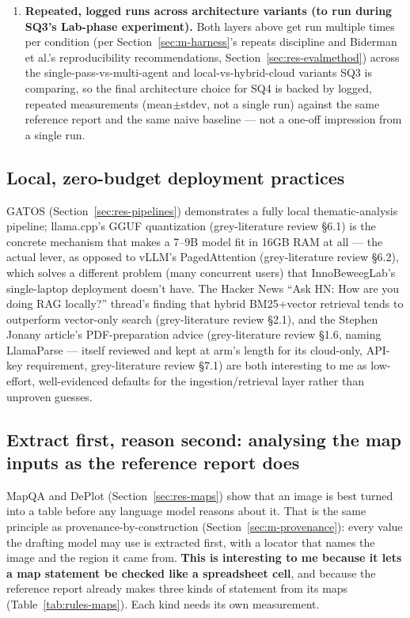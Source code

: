 \begin{enumerate}
\item \textbf{Repeated, logged runs across architecture variants (to run during SQ3's Lab-phase experiment).} Both layers above get run multiple times per condition (per Section~\ref{sec:m-harness}'s repeats discipline and Biderman et al.'s reproducibility recommendations, Section~\ref{sec:res-evalmethod}) across the single-pass-vs-multi-agent and local-vs-hybrid-cloud variants SQ3 is comparing, so the final architecture choice for SQ4 is backed by logged, repeated measurements (mean$\pm$stdev, not a single run) against the same reference report and the same naive baseline — not a one-off impression from a single run.
\end{enumerate}

\subsection{Local, zero-budget deployment practices}\label{sec:m-local}

GATOS (Section~\ref{sec:res-pipelines}) demonstrates a fully local thematic-analysis pipeline; llama.cpp's GGUF quantization (grey-literature review \S6.1) is the concrete mechanism that makes a 7–9B model fit in 16GB RAM at all — the actual lever, as opposed to vLLM's PagedAttention (grey-literature review \S6.2), which solves a different problem (many concurrent users) that InnoBeweegLab's single-laptop deployment doesn't have. The Hacker News \textquotedblleft{}Ask HN: How are you doing RAG locally?\textquotedblright{} thread's finding that hybrid BM25+vector retrieval tends to outperform vector-only search (grey-literature review \S2.1), and the Stephen Jonany article's PDF-preparation advice (grey-literature review \S1.6, naming LlamaParse — itself reviewed and kept at arm's length for its cloud-only, API-key requirement, grey-literature review \S7.1) are both interesting to me as low-effort, well-evidenced defaults for the ingestion/retrieval layer rather than unproven guesses.



\subsection{Extract first, reason second: analysing the map inputs as the reference report does}\label{sec:m-maps}

MapQA and DePlot (Section~\ref{sec:res-maps}) show that an image is best turned into a table before any language model reasons about it. That is the same principle as provenance-by-construction (Section~\ref{sec:m-provenance}): every value the drafting model may use is extracted first, with a locator that names the image and the region it came from. \textbf{This is interesting to me because it lets a map statement be checked like a spreadsheet cell}, and because the reference report already makes three kinds of statement from its maps (Table~\ref{tab:rules-maps}). Each kind needs its own measurement.

